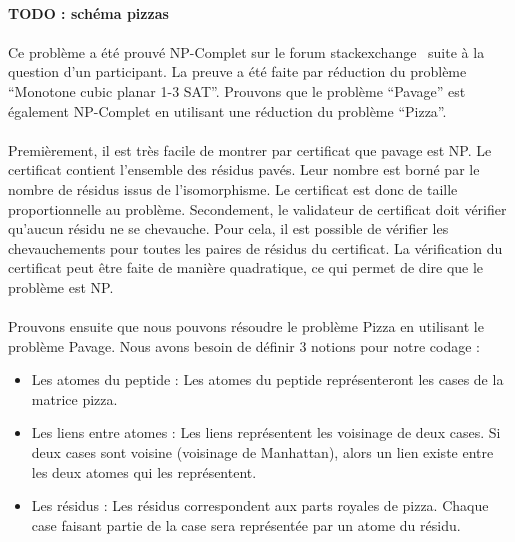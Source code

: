 \documentclass[12pt,french,twoside]{report}
\begin{document}
\paragraph{TODO : schéma pizzas}

\paragraph{}Ce problème a été prouvé NP-Complet sur le forum stackexchange~\cite{de_biasi_complexity_2015} suite à la question d'un participant.
La preuve a été faite par réduction du problème ``Monotone cubic planar 1-3 SAT''.
Prouvons que le problème ``Pavage'' est également NP-Complet en utilisant une réduction du problème ``Pizza''.

\paragraph{}Premièrement, il est très facile de montrer par certificat que pavage est NP.
Le certificat contient l'ensemble des résidus pavés.
Leur nombre est borné par le nombre de résidus issus de l'isomorphisme.
Le certificat est donc de taille proportionnelle au problème.
Secondement, le validateur de certificat doit vérifier qu'aucun résidu ne se chevauche.
Pour cela, il est possible de vérifier les chevauchements pour toutes les paires de résidus du certificat.
La vérification du certificat peut être faite de manière quadratique, ce qui permet de dire que le problème est NP.

\paragraph{}Prouvons ensuite que nous pouvons résoudre le problème Pizza en utilisant le problème Pavage.
Nous avons besoin de définir 3 notions pour notre codage :
\begin{itemize}
	\item Les atomes du peptide : Les atomes du peptide représenteront les cases de la matrice pizza.
	\item Les liens entre atomes : Les liens représentent les voisinage de deux cases.
Si deux cases sont voisine (voisinage de Manhattan), alors un lien existe entre les deux atomes qui les représentent.
	\item Les résidus : Les résidus correspondent aux parts royales de pizza.
Chaque case faisant partie de la case sera représentée par un atome du résidu.
\end{itemize}
\end{document}
